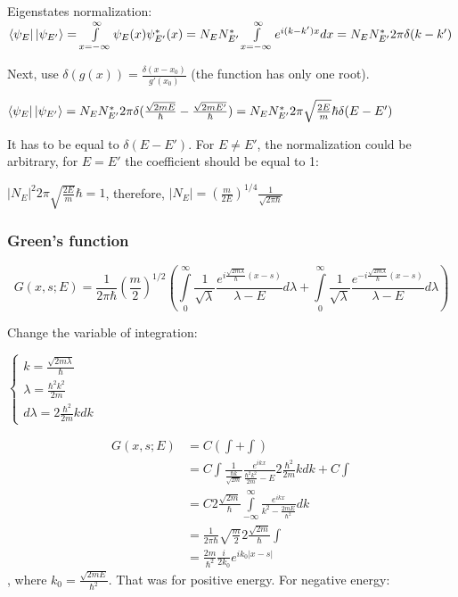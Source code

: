 \documentclass[12pt, a4paper]{article}
\begin{document}
Eigenstates normalization: $\bra{\psi_E} \ket{\psi_{E'}} = \int\limits_{x = - \infty}^\infty \psi_E(x) \psi_{E'}^*(x) = N_E N_{E'}^* \int\limits_{x = - \infty}^\infty e^{i (k - k') x} dx = \\ N_E N^*_{E'} 2 \pi \delta(k - k')$

Next, use $\delta(g(x)) = \frac{\delta(x - x_0)}{g'(x_0)}$ (the function has only one root).

$\bra{\psi_E} \ket{\psi_{E'}} = N_E N^*_{E'} 2 \pi \delta(\frac{\sqrt{2 m E}}{\hbar} - \frac{\sqrt{2 m E'}}{\hbar}) = N_E N^*_{E'} 2 \pi \sqrt{\frac{2 E }{m}} \hbar \delta(E - E')$

It has to be equal to $\delta(E - E')$. For $E \ne E'$, the normalization could be arbitrary, for $E = E'$ the coefficient should be equal to 1:

$|N_E|^2 2 \pi \sqrt{\frac{2 E}{m}} \hbar = 1$, therefore, $|N_E| = \left( \frac{m}{2E}\right)^{1/4}  \frac{1}{\sqrt{2 \pi \hbar}}$

\subsubsection{Green's function}
$$G(x, s; E) = \frac{1}{2 \pi \hbar} \left( \frac{m}{2}\right)^{1/2}  \left( \int\limits_{0}^{\infty} \frac{1}{\sqrt{\lambda}}\frac{e^{i \frac{\sqrt{2 m \lambda}}{\hbar} (x - s)}}{\lambda - E} d \lambda + \int\limits_{0}^{\infty} \frac{1}{\sqrt{\lambda}}\frac{e^{-i \frac{\sqrt{2 m \lambda}}{\hbar} (x - s)}}{\lambda - E} d \lambda \right)$$

Change the variable of integration: 

$\begin{cases}
k = \frac{\sqrt{2 m \lambda}}{\hbar} \\
\lambda = \frac{\hbar^2 k^2}{2m}\\
d \lambda = 2\frac{\hbar^2}{2 m} k dk
\end{cases}$


\begin{align*}
G(x, s; E) &= C (\int + \int) \\
&= C \int \frac{1}{\frac{\hbar k}{\sqrt{2 m}}} \frac{e^{ikx}}{\frac{\hbar^2 k^2}{2m} - E} 2 \frac{\hbar^2}{2 m} k dk + C \int \\
&= C 2 \frac{\sqrt{2m}}{\hbar} \int\limits_{-\infty}^\infty \frac{e^{ikx}}{k^2 - \frac{2mE}{\hbar^2}} dk \\
&= \frac{1}{2 \pi \hbar} \sqrt{\frac{m}{2}} 2 \frac{\sqrt{2 m}}{\hbar} \int  \\
&= \frac{2m}{\hbar^2} \frac{i}{2 k_0} e^{i k_0 |x - s|}
\end{align*}
, where $k_0 = \frac{\sqrt{2 m E}}{\hbar^2}$. That was for positive energy. For negative energy:
\end{document}
